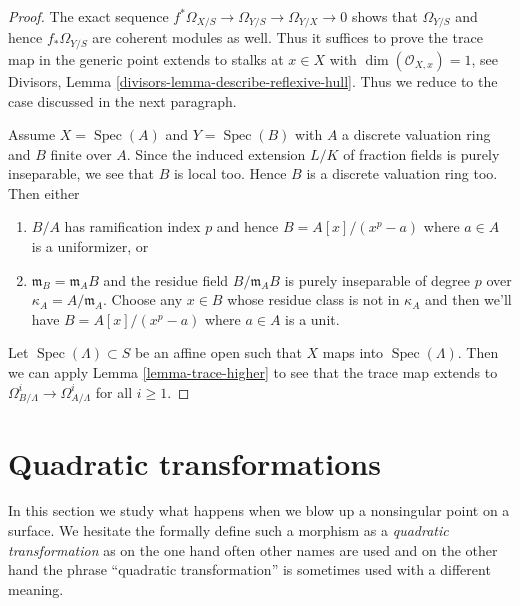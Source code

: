 \documentclass{stacks-project}
\theoremstyle{plain}
\theoremstyle{definition}
\theoremstyle{remark}
\numberwithin{equation}{subsection}
\def\Spec{\mathop{\mathrm{Spec}}}
\begin{document}
\begin{proof}
The exact sequence $f^*\Omega_{X/S} \to \Omega_{Y/S} \to \Omega_{Y/X} \to 0$
shows that $\Omega_{Y/S}$ and hence $f_*\Omega_{Y/S}$ are coherent modules
as well. Thus it suffices to prove the trace map in the generic point
extends to stalks at $x \in X$ with $\dim(\mathcal{O}_{X, x}) = 1$, see
Divisors, Lemma \ref{divisors-lemma-describe-reflexive-hull}.
Thus we reduce to the case discussed in the next paragraph.

\medskip\noindent
Assume $X = \Spec(A)$ and $Y = \Spec(B)$ with $A$ a discrete valuation
ring and $B$ finite over $A$. Since the induced extension $L/K$
of fraction fields is purely inseparable, we see that $B$ is local too.
Hence $B$ is a discrete valuation ring too. Then either
\begin{enumerate}
\item $B/A$ has ramification index $p$ and hence $B = A[x]/(x^p - a)$
where $a \in A$ is a uniformizer, or
\item $\mathfrak m_B = \mathfrak m_A B$ and the residue field
$B/\mathfrak m_A B$ is purely inseparable of degree $p$ over
$\kappa_A = A/\mathfrak m_A$.
Choose any $x \in B$ whose residue class is not in $\kappa_A$
and then we'll have $B = A[x]/(x^p - a)$ where $a \in A$ is
a unit.
\end{enumerate}
Let $\Spec(\Lambda) \subset S$ be an affine open such that
$X$ maps into $\Spec(\Lambda)$. Then we can apply
Lemma \ref{lemma-trace-higher}
to see that the trace map extends to
$\Omega^i_{B/\Lambda} \to \Omega^i_{A/\Lambda}$
for all $i \geq 1$.
\end{proof}


















\section{Quadratic transformations}
\label{section-quadratic}

\noindent
In this section we study what happens when we blow up a nonsingular point
on a surface. We hesitate the formally define such a morphism as a
{\it quadratic transformation} as on the one hand often other names are
used and on the other hand the phrase ``quadratic transformation'' is
sometimes used with a different meaning.
\end{document}
